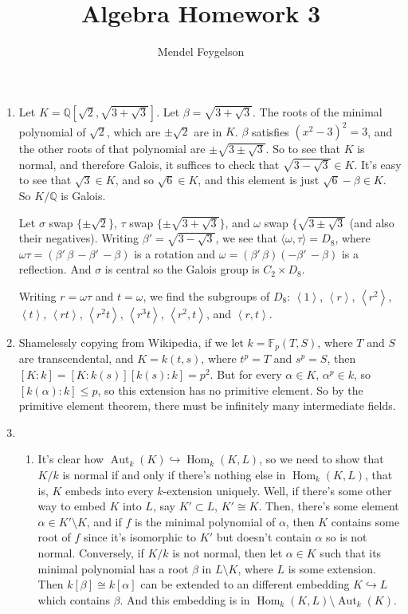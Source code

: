 \documentclass{article}
\title{Algebra Homework 3}
\author{Mendel Feygelson}
\newcommand\QQ{\mathbb Q}
\newcommand\FF{\mathbb F}
\renewcommand\a[1]{\left\langle#1\right\rangle}
\DeclareMathOperator\Hom{Hom}
\DeclareMathOperator\Aut{Aut}
\begin{document}
\maketitle
\begin{enumerate}

   \item Let $K = \QQ[\sqrt2,\sqrt{3+\sqrt3}]$. Let $\beta = \sqrt{3+\sqrt3}$.
      The roots of the minimal polynomial of $\sqrt2$, which are $\pm\sqrt2$ are
      in $K$. $\beta$ satisfies $(x^2-3)^2=3$, and the other roots of that
      polynomial are $\pm\sqrt{3\pm\sqrt3}$. So to see that $K$ is normal, and
      therefore Galois, it suffices to check that $\sqrt{3-\sqrt3} \in K$. It's
      easy to see that $\sqrt3 \in K$, and so $\sqrt6 \in K$, and this element
      is just $\sqrt6 - \beta \in K$. So $K/\QQ$ is Galois.

      Let $\sigma$ swap $\{\pm\sqrt2\}$, $\tau$ swap $\{\pm\sqrt{3+\sqrt3}\}$,
      and $\omega$ swap $\{\sqrt{3\pm\sqrt3}$ (and also their negatives).
      Writing $\beta' = \sqrt{3-\sqrt3}$, we see that $\langle\omega,\tau\rangle
      = D_8$, where $\omega\tau = (\beta'\,\beta\,-\beta'\,-\beta)$ is a
      rotation and $\omega=(\beta'\,\beta)(-\beta'\,-\beta)$ is a reflection.
      And $\sigma$ is central so the Galois group is $C_2 \times D_8$.
      
      Writing $r = \omega\tau$ and $t = \omega$, we find the subgroups of $D_8$:
      $\a1$, $\a{r}$, $\a{r^2}$, $\a{t}$, $\a{rt}$, $\a{r^2t}$, $\a{r^3t}$,
      $\a{r^2,t}$, and $\a{r,t}$.

   \item Shamelessly copying from Wikipedia, if we let $k = \FF_p(T,S)$, where
      $T$ and $S$ are transcendental, and $K = k(t,s)$, where $t^p = T$ and
      $s^p = S$, then $[K:k] = [K:k(s)][k(s):k] = p^2$. But for every $\alpha
      \in K$, $\alpha^p \in k$, so $[k(\alpha):k] \leq p$, so this extension has
      no primitive element. So by the primitive element theorem, there must be
      infinitely many intermediate fields.

   \item
      \begin{enumerate}
         \item It's clear how $\Aut_k(K) \hookrightarrow \Hom_k(K,L)$, so we
            need to show that $K/k$ is normal if and only if there's nothing
            else in $\Hom_k(K,L)$, that is, $K$ embeds into every $k$-extension
            uniquely. Well, if there's some other way to embed $K$ into $L$, say
            $K' \subset L$, $K' \cong K$. Then, there's some element $\alpha
            \in K' \setminus K$, and if $f$ is the minimal polynomial of
            $\alpha$, then $K$ contains some root of $f$ since it's isomorphic
            to $K'$ but doesn't contain $\alpha$ so is not normal. Conversely,
            if $K/k$ is not normal, then let $\alpha \in K$ such that its
            minimal polynomial has a root $\beta$ in $L \setminus K$, where $L$
            is some extension. Then $k[\beta] \cong k[\alpha]$ can be extended
            to an different embedding $K \hookrightarrow L$ which contains
            $\beta$. And this embedding is in $\Hom_k(K,L) \setminus \Aut_k(K)$.


\end{enumerate}
\end{enumerate}
\end{document}
